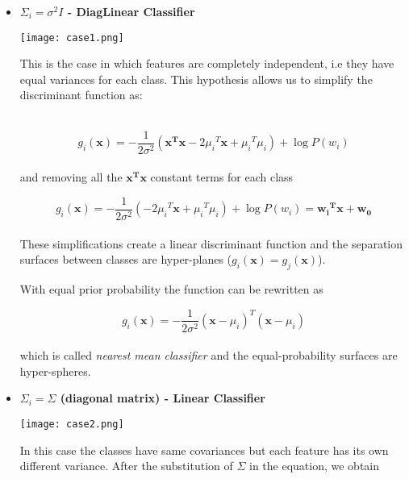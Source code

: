 \documentclass{standalone}
\begin{document}
\begin{itemize}

\item \textbf{$\Sigma_i=\sigma^2I$ - DiagLinear Classifier}

\begin{minipage}{.30\textwidth}
\hspace{-.5cm}
\texttt{[image: case1.png]}
\end{minipage}%
\begin{minipage}{.70\textwidth}
This is the case in which features are completely independent, i.e they have equal variances for each class.
This hypothesis allows us to simplify the discriminant function as:
\end{minipage}\\

\begin{equation}
g_i(\mathbf{x})=-\frac{1}{2\sigma^2}(\mathbf{x^Tx}-2{\mu_i}^T\mathbf{x} + {\mu_i}^T\mu_i) + \log P(w_i)
\end{equation}
\\
and removing all the $\mathbf{x^Tx}$ constant terms for each class

\begin{equation}
g_i(\mathbf{x}) = -\frac{1}{2\sigma^2}(-2{\mu_i}^T\mathbf{x}+{\mu_i}^T\mu_i)+\log P(w_i) = \mathbf{{w_i}^Tx}+\mathbf{w_0}
\end{equation}
\\
These simplifications create a linear discriminant function and the separation surfaces between classes are hyper-planes ($g_i(\mathbf{x})=g_j(\mathbf{x})$).

With equal prior probability the function can be rewritten as

\begin{equation}
g_i(\mathbf{x}) = -\frac{1}{2\sigma^2}(\mathbf{x}-\mu_i)^T(\mathbf{x}-\mu_i)
\end{equation}
\\
which is called \emph{nearest mean classifier} and the equal-probability surfaces are hyper-spheres.

\item \textbf{$\Sigma_i = \Sigma$ (diagonal matrix) - Linear Classifier}

\begin{minipage}{.30\textwidth}
\hspace{-.5cm}
\texttt{[image: case2.png]}
\end{minipage}%
\begin{minipage}{.70\textwidth}
In this case the classes have same covariances but each feature has its own different variance.
After the substitution of $\Sigma$ in the equation, we obtain
\end{minipage}\\


\end{itemize}
\end{document}
